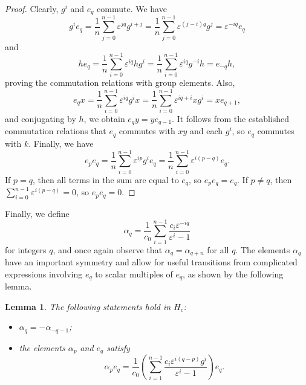\documentclass[pdftex]{sigma}
\newcommand\eps{\varepsilon}
\numberwithin{equation}{section}
\newtheorem{Lemma}[Theorem]{Lemma}
\theoremstyle{definition}
\begin{document}
\begin{proof}
 Clearly, $g^i$ and $e_q$ commute.
 We have
 \begin{equation*}
 g^i e_q = \frac1n \sum\limits_{j = 0}^{n - 1}
 \eps^{jq} g^{i + j}
 = \frac1n \sum\limits_{j = 0}^{n - 1}
 \eps^{(j - i)q} g^j
 = \eps^{-iq} e_q
 \end{equation*}
 and
 \begin{equation*}
 h e_q = \frac1n \sum\limits_{i = 0}^{n - 1}
 \eps^{iq} h g^i
 = \frac1n \sum\limits_{i = 0}^{n - 1}
 \eps^{iq} g^{-i} h
 = e_{-q} h,
 \end{equation*}
 proving the commutation relations with group elements.
 Also,
 \begin{equation*}
 e_q x = \frac1n \sum\limits_{i = 0}^{n - 1}
 \eps^{iq} g^i x
 = \frac1n \sum\limits_{i = 0}^{n - 1}
 \eps^{iq + i} x g^i
 = x e_{q + 1},
 \end{equation*}
 and conjugating by $h$,
 we obtain $e_q y = y e_{q - 1}$.
 It follows from the established commutation relations
 that $e_q$ commutes with $xy$ and each $g^i$,
 so $e_q$ commutes with $k$.
 Finally, we have
 \begin{equation*}
 e_p e_q = \frac1n \sum\limits_{i = 0}^{n - 1}
 \eps^{ip} g^i e_q
 = \frac1n \sum\limits_{i = 0}^{n - 1}
 \eps^{i(p - q)} e_q.
 \end{equation*}
 If $p = q$, then all terms in the sum are equal to $e_q$,
 so $e_p e_q = e_q$.
 If $p \neq q$, then $\sum_{i = 0}^{n - 1} \eps^{i(p - q)} = 0$,
 so $e_p e_q = 0$.
\end{proof}

Finally, we define
\begin{equation*}
 \alpha_q = \frac1{c_0}
 \sum\limits_{i = 1}^{n - 1} \frac{c_i \eps^{-iq}}{\eps^i - 1}
\end{equation*}
for integers $q$,
and once again observe that $\alpha_{q} = \alpha_{q + n}$ for all $q$.
The elements $\alpha_q$ have an important symmetry
and allow for useful transitions
from complicated expressions involving $e_q$
to scalar multiples of $e_q$,
as shown by the following lemma.

\begin{Lemma}
 \label{lem:a_prop}
 The following statements hold in $H_c$:
 \begin{itemize}\itemsep=0pt
 \item $\alpha_q = -\alpha_{-q - 1}$;
 \item the elements $\alpha_p$ and $e_q$ satisfy
 \begin{equation*}
 \alpha_p e_q = \frac1{c_0}
 \left( \sum_{i = 1}^{n - 1}
 \frac{c_i \eps^{i(q - p)} g^i}{\eps^i - 1}
 \right) e_q.
 \end{equation*}
 \end{itemize}
\end{Lemma}
\end{document}
